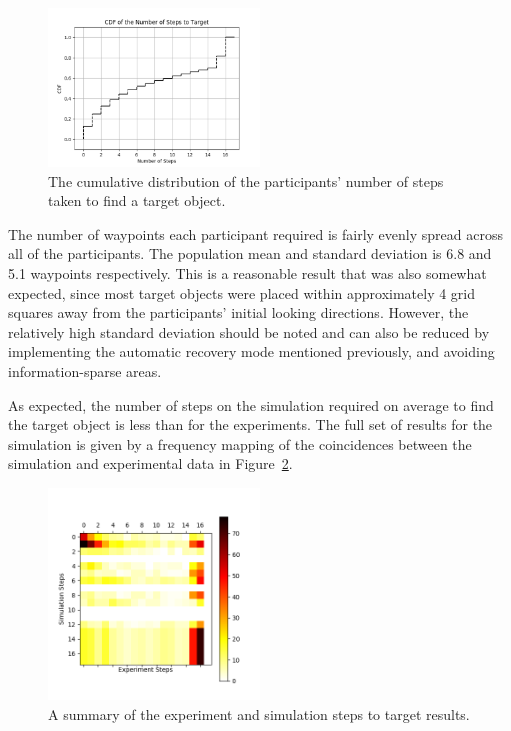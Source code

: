 \documentclass[a4paper, twoside]{article}
\begin{document}
\begin{figure}
  \centering
  \includegraphics[width=0.5\textwidth]{figures/cdf_total_steps.png}
  \caption{The cumulative distribution of the participants' number of steps taken to find a target object. }\label{fig:nsteps-participants}
\end{figure}

The number of waypoints each participant required is fairly evenly spread across all of the participants. The population mean and standard deviation is 6.8 and 5.1 waypoints respectively. This is a reasonable result that was also somewhat expected, since most target objects were placed within approximately 4 grid squares away from the participants' initial looking directions. However, the relatively high standard deviation should be noted and can also be reduced by implementing the automatic recovery mode mentioned previously, and avoiding information-sparse areas.

As expected, the number of steps on the simulation required on average to find the target object is less than for the experiments. The full set of results for the simulation is given by a frequency mapping of the coincidences between the simulation and experimental data in Figure~\ref{fig:sim-vs-experiment}.

\begin{figure}
  \centering
  \includegraphics[width=0.5\textwidth]{figures/experiment_vs_simulation.png}
  \caption{A summary of the experiment and simulation steps to target results. }\label{fig:sim-vs-experiment}
\end{figure}
\end{document}
